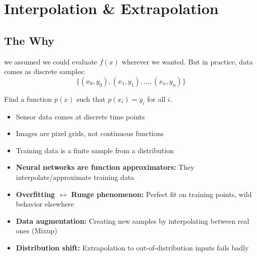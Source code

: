 \chapter{Interpolation \& Extrapolation}



\section{The Why}

 we assumed we could evaluate $f(x)$ wherever we wanted.
But in practice, data comes as discrete samples:
\begin{equation}
    \{(x_0, y_0), (x_1, y_1), \ldots, (x_n, y_n)\}
\end{equation}

 Find a function $p(x)$ such that $p(x_i) = y_i$ for all $i$.

\begin{itemize}
    \item Sensor data comes at discrete time points
    \item Images are pixel grids, not continuous functions
    \item Training data is a finite sample from a distribution
\end{itemize}


\begin{itemize}
    \item \textbf{Neural networks are function approximators:} They interpolate/approximate training data
    \item \textbf{Overfitting $\leftrightarrow$ Runge phenomenon:} Perfect fit on training points, wild behavior elsewhere
    \item \textbf{Data augmentation:} Creating new samples by interpolating between real ones (Mixup)
    \item \textbf{Distribution shift:} Extrapolation to out-of-distribution inputs fails badly
\end{itemize}

